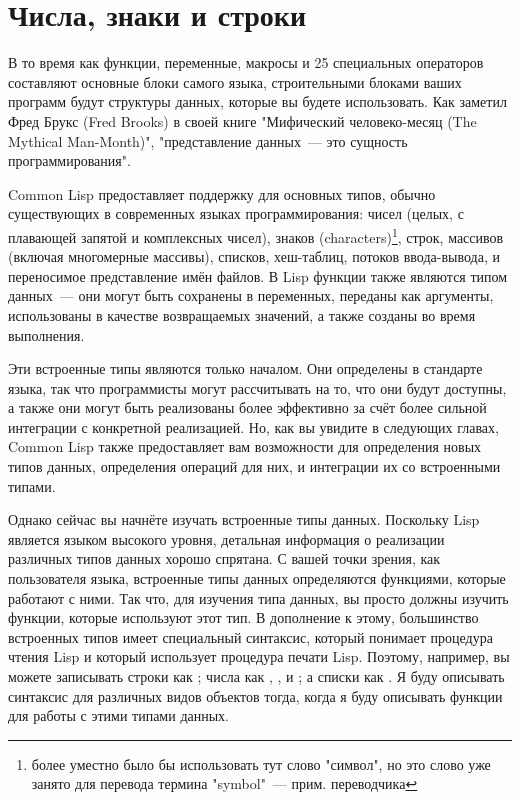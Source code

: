 \chapter{Числа, знаки и строки}
\label{ch:10}

В то время как функции, переменные, макросы и 25 специальных операторов составляют
основные блоки самого языка, строительными блоками ваших программ будут структуры данных,
которые вы будете использовать.  Как заметил Фред Брукс (Fred Brooks) в своей книге
"Мифический человеко-месяц (The Mythical Man-Month)", "представление данных~--- это
сущность программирования".

Common Lisp предоставляет поддержку для основных типов, обычно существующих в современных
языках программирования: чисел (целых, с плавающей запятой и комплексных чисел), знаков
(characters)\footnote{более уместно было бы использовать тут слово "символ", но это слово
  уже занято для перевода термина "symbol"~--- прим. переводчика }, строк, массивов
(включая многомерные массивы), списков, хеш-таблиц, потоков ввода-вывода, и переносимое
представление имён файлов.  В Lisp функции также являются типом данных~--- они могут быть
сохранены в переменных, переданы как аргументы, использованы в качестве возвращаемых
значений, а также созданы во время выполнения.

Эти встроенные типы являются только началом.  Они определены в стандарте языка, так что
программисты могут рассчитывать на то, что они будут доступны, а также они могут быть
реализованы более эффективно за счёт более сильной интеграции с конкретной реализацией.
Но, как вы увидите в следующих главах, Common Lisp также предоставляет вам возможности для
определения новых типов данных, определения операций для них, и интеграции их со
встроенными типами.

Однако сейчас вы начнёте изучать встроенные типы данных.  Поскольку Lisp является языком
высокого уровня, детальная информация о реализации различных типов данных хорошо спрятана.
С вашей точки зрения, как пользователя языка, встроенные типы данных определяются
функциями, которые работают с ними.  Так что, для изучения типа данных, вы просто должны
изучить функции, которые используют этот тип.  В дополнение к этому, большинство
встроенных типов имеет специальный синтаксис, который понимает процедура чтения Lisp и
который использует процедура печати Lisp.  Поэтому, например, вы можете записывать строки
как ; числа как , , и ; а списки как .  Я буду описывать синтаксис для различных видов объектов тогда, когда я буду
описывать функции для работы с этими типами данных.

